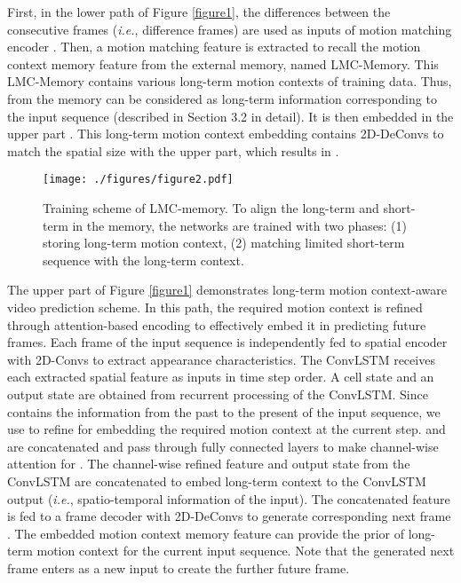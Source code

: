\documentclass[final]{cvpr}
\begin{document}
First, in the lower path of Figure \ref{figure1}, the differences between the consecutive frames (\textit{i.e.}, difference frames) are used as inputs of motion matching encoder . Then, a motion matching feature  is extracted to recall the motion context memory feature  from the external memory, named LMC-Memory. This LMC-Memory contains various long-term motion contexts of training data. Thus,  from the memory can be considered as long-term information corresponding to the input sequence  (described in Section 3.2 in detail). It is then embedded in the upper part . This long-term motion context embedding contains 2D-DeConvs to match the spatial size with the upper part, which results in .

\begin{figure*}[t]
	\begin{minipage}[b]{1.0\linewidth}
		\centering
		\centerline{\texttt{[image: ./figures/figure2.pdf]}}
	\end{minipage}
	\vspace{-0.6cm}
	\caption{Training scheme of LMC-memory. To align the long-term and short-term in the memory, the networks are trained with two phases: (1) storing long-term motion context, (2) matching limited short-term sequence with the long-term context.}
	\label{figure2}
	\vspace{-0.2cm}
\end{figure*}


The upper part of Figure \ref{figure1}  demonstrates long-term motion context-aware video prediction  scheme. In this path, the required motion context is refined through attention-based encoding to effectively embed it in predicting future frames. Each frame of the input sequence is independently fed to spatial encoder  with 2D-Convs to extract appearance characteristics. The ConvLSTM \cite{xingjian2015convolutional} receives each extracted spatial feature  as inputs in time step order. A cell state  and an output state  are obtained from recurrent processing of the ConvLSTM. Since  contains the information from the past to the present of the input sequence, we use  to refine  for embedding the required motion context at the current step.  and  are concatenated and pass through fully connected layers to make channel-wise attention  for . The channel-wise refined feature  and output state  from the ConvLSTM are concatenated to embed long-term context to the ConvLSTM output (\textit{i.e.}, spatio-temporal information of the input). The concatenated feature is fed to a frame decoder  with 2D-DeConvs to generate corresponding next frame . The embedded motion context memory feature can provide the prior of long-term motion context for the current input sequence. Note that the generated next frame  enters  as a new input to create the further future frame.
\end{document}
